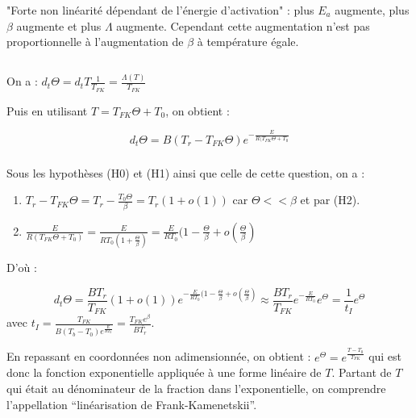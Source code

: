 \documentclass[10pt,a4paper]{report}
\begin{document}
"Forte non linéarité dépendant de l'énergie d'activation" : plus $E_a$ augmente, plus $\beta$ augmente et plus $\Lambda$ augmente.
Cependant cette augmentation n'est pas proportionnelle à  l'augmentation de $\beta$ à température égale.

\subsection{} %
\subsubsection{} %

On a : $ d_t\Theta = d_tT \frac{1}{T_{FK}}  = \frac{\Lambda(T)}{T_{FK}}$

Puis en utilisant $ T = T_{FK} \Theta + T_0 $, on obtient :

	$$ d_t\Theta = B(T_r - T_{FK} \Theta)e^{-\frac{E}{R(T_{FK}\Theta+T_0}} $$
	
\subsubsection{} %

Sous les hypothèses (H0) et (H1) ainsi que celle de cette question, on a :
\begin{enumerate}
	\item $T_r - T_{FK} \Theta = T_r - \frac{T_0\Theta}{\beta} = T_r(1 + o(1))$ car $\Theta << \beta$ et par (H2).
	\item $\frac{E}{R(T_{FK}\Theta+T_0)} = \frac{E}{RT_0(1+\frac{\Theta}{\beta})} = \frac{E}{RT_0} (1-\frac{\Theta}{\beta} + o(\frac{\Theta}{\beta}) $ 
\end{enumerate} 

D'où : 

$$ d_t\Theta = \frac{BT_r}{T_{FK}}(1+o(1))e^{-\frac{E}{RT_0}(1-\frac{\Theta}{\beta} + o(\frac{\Theta}{\beta})} \approx \frac{BT_r}{T_{FK}} e^{-\frac{E}{RT_0}} e^{\Theta} = \frac{1}{t_I}e^{\Theta} $$
avec $t_I = \frac{T_{FK}}{B(T_b-T_0)e^{\frac{E}{RT_0}}} = \frac{T_{FK}e^{\beta}}{B\bar{T_r}} $.

En repassant en coordonnées non adimensionnée, on obtient : $e^{\Theta} = e^{\frac{T-T_0}{T_{FK}}}$ qui est donc la fonction exponentielle appliquée à une forme linéaire de $T$. Partant de $T$ qui était au dénominateur de la fraction dans l'exponentielle, on comprendre l'appellation “linéarisation de Frank-Kamenetskii”.

\subsubsection{} %
\end{document}
